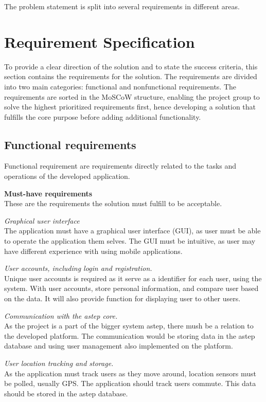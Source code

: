 The problem statement is split into several requirements in different areas.
\section{Requirement Specification}
To provide a clear direction of the solution and to state the success criteria, this section contains the requirements for the solution. 
The requirements are divided into two main categories: functional and nonfunctional requirements. 
The requirements are sorted in the MoSCoW structure, enabling the project group to solve the highest prioritized requirements first, hence developing a solution that fulfills the core purpose before adding additional functionality.


\subsection{Functional requirements}
Functional requirement are requirements directly related to the tasks and operations of the developed application.

\textbf{Must-have requirements}\\
These are the requirements the solution must fulfill to be acceptable.

\textit{Graphical user interface}\\
The application must have a graphical user interface (GUI), as user must be able to operate the application them selves. 
The GUI must be intuitive, as user may have different experience with using mobile applications.

\textit{User accounts, including login and registration.}\\
Unique user accounts is required as it serve as a identifier for each user, using the system. With user accounts, store personal information, and compare user based on the data. 
It will also provide function for displaying user to other users.

\textit{Communication with the \gls{astep} core.}\\
As the project is a part of the bigger system \gls{astep}, there mush be a relation to the developed platform. 
The communication would be storing data in the \gls{astep} database and using user management also implemented on the platform.

\textit{User location tracking and storage.}\\
As the application must track users as they move around, location sensors must be polled, usually GPS. 
The application should track users commute.
This data should be stored in the \gls{astep} database.

